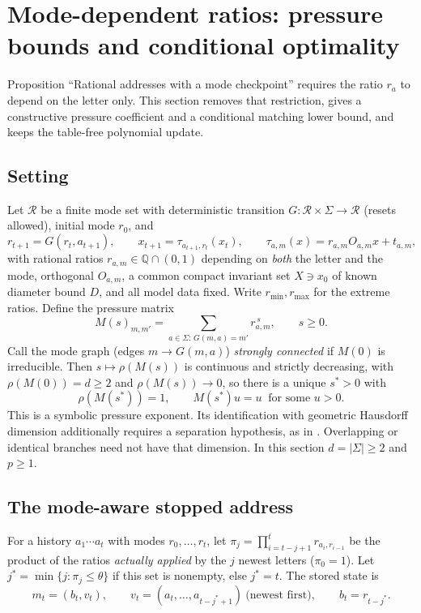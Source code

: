 \section{Mode-dependent ratios: pressure bounds and conditional optimality}\label{III:M:rev13:sec:mode}

Proposition ``Rational addresses with a mode checkpoint'' requires the ratio $r_a$ to depend
on the letter only. This section removes that restriction, gives a constructive pressure coefficient and a conditional matching
lower bound, and keeps the table-free polynomial update.

\subsection{Setting}
Let $\mathcal R$ be a finite mode set with deterministic transition
$G:\mathcal R\times\Sigma\to\mathcal R$ (resets allowed), initial mode $r_0$, and
\[
r_{t+1}=G(r_t,a_{t+1}),\qquad x_{t+1}=\tau_{a_{t+1},r_t}(x_t),\qquad
\tau_{a,m}(x)=r_{a,m}O_{a,m}x+t_{a,m},
\]
with rational ratios $r_{a,m}\in\mathbb Q\cap(0,1)$ depending on \emph{both} the letter
and the mode, orthogonal $O_{a,m}$, a common compact invariant set $X\ni x_0$ of known
diameter bound $D$, and all model data fixed. Write $r_{\min},r_{\max}$ for the extreme
ratios. Define the pressure matrix
\begin{equation}\label{III:M:rev13:eq:pressure}
M(s)_{m,m'}=\sum_{a\in\Sigma:\,G(m,a)=m'}r_{a,m}^{\,s},\qquad s\ge0 .
\end{equation}
Call the mode graph (edges $m\to G(m,a)$) \emph{strongly connected} if $M(0)$ is
irreducible. Then $s\mapsto\rho(M(s))$ is continuous and strictly decreasing, with
$\rho(M(0))=d\ge2$ and $\rho(M(s))\to0$, so there is a unique $s^\ast>0$ with
\begin{equation}\label{III:M:rev13:eq:sstar}
\rho(M(s^\ast))=1,\qquad M(s^\ast)u=u\ \text{ for some }u>0 .
\end{equation}
This is a symbolic pressure exponent. Its identification with geometric
Hausdorff dimension additionally requires a separation hypothesis, as in
\citet{mauldin_williams}. Overlapping or identical branches need not have
that dimension. In this section $d=|\Sigma|\ge2$ and $p\ge1$.

\subsection{The mode-aware stopped address}
For a history $a_1\cdots a_t$ with modes $r_0,\dots,r_t$, let
$\pi_j=\prod_{i=t-j+1}^{t}r_{a_i,r_{i-1}}$ be the product of the ratios \emph{actually
applied} by the $j$ newest letters ($\pi_0=1$). Let
$j^\ast=\min\{j:\pi_j\le\theta\}$ if this set is nonempty, else $j^\ast=t$. The stored state is
\[
m_t=(b_t,v_t),\qquad v_t=(a_t,\dots,a_{t-j^\ast+1})\ \text{(newest first)},\qquad
b_t=r_{t-j^\ast}.
\]

